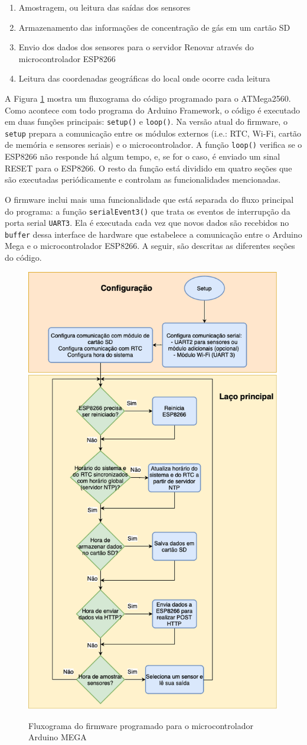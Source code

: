 \begin{enumerate}
    \item Amostragem, ou leitura das saídas dos sensores
    \item Armazenamento das informações de concentração de gás em um cartão SD
    \item Envio dos dados dos sensores para o servidor Renovar através do microcontrolador ESP8266
    \item Leitura das coordenadas geográficas do local onde ocorre cada leitura
\end{enumerate}

A Figura \ref{fig:fw-main-loop} mostra um fluxograma do código programado para o ATMega2560. Como acontece com todo programa do Arduino Framework, o código é executado em duas funções principais: \texttt{setup()} e \texttt{loop()}. Na versão atual do firmware, o \texttt{setup} prepara a comunicação entre os módulos externos (i.e.: RTC, Wi-Fi, cartão de memória e sensores seriais) e o microcontrolador. A função \texttt{loop()} verifica se o ESP8266 não responde há algum tempo, e, se for o caso, é enviado um sinal RESET para o ESP8266. O resto da função está dividido em quatro seções que são executadas periódicamente e controlam as funcionalidades mencionadas. 

O firmware inclui mais uma funcionalidade que está separada do fluxo principal do programa: a função \texttt{serialEvent3()} que trata os eventos de interrupção da porta serial \texttt{UART3}. Ela é executada cada vez que novos dados são recebidos no \texttt{buffer} dessa interface de hardware que estabelece a comunicação entre o Arduino Mega e o microcontrolador ESP8266. A seguir, são descritas as diferentes seções do código.

\begin{figure}
    \centering
    \caption{Fluxograma do firmware programado para o microcontrolador Arduino MEGA}
    \includegraphics[width=0.5\linewidth]{aftertext//Firmware//Figuras/Main Loop (PT).png}
    \label{fig:fw-main-loop}
\end{figure}

